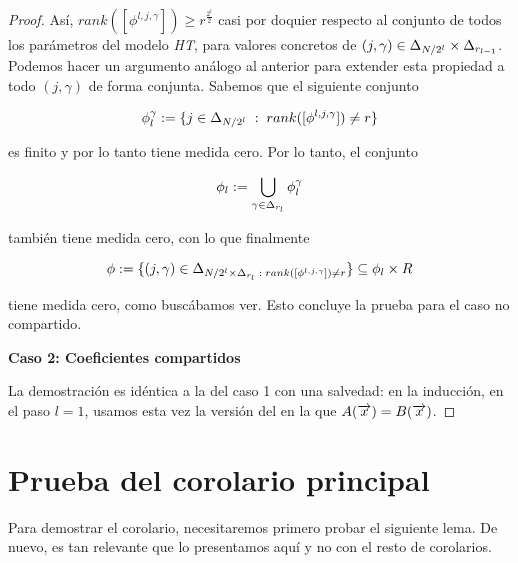 \begin{proof}
    Así, $rank([\phi^{l, j, \gamma}]) \geq r^{\frac{2^l}{2}}$ casi por doquier respecto al conjunto de todos los parámetros del modelo \textit{HT}, para valores concretos de $(j, \gamma) \in \Delta_{N/2^l} \times \Delta_{r_{l-1}}$. Podemos hacer un argumento análogo al anterior para extender esta propiedad a todo $(j, \gamma)$ de forma conjunta. Sabemos que el siguiente conjunto

    \begin{equation}
        \phi_l^{\gamma} := \{ j \in \Delta_{N/2^l} \; : \; rank([\phi^{l, j, \gamma}]) \neq r \}
    \end{equation}

    es finito y por lo tanto tiene medida cero. Por lo tanto, el conjunto

    \begin{equation}
        \phi_l := \bigcup_{ \gamma \in \Delta_{r_l}} \phi_l^{\gamma}
    \end{equation}

    también tiene medida cero, con lo que finalmente

    \begin{equation}
        \phi := \{ (j, \gamma) \in \Delta_{N/2^l \times \Delta_{r_l} \; : \; rank([\phi^{l, j, \gamma}]) \neq r} \} \subseteq \phi_l \times R
    \end{equation}

    tiene medida cero, como buscábamos ver. Esto concluye la prueba para el caso no compartido.

    \textbf{Caso 2: Coeficientes compartidos}

    La demostración es idéntica a la del caso 1 con una salvedad: en la inducción, en el paso $l = 1$, usamos esta vez la versión del  en la que $A(\overrightarrow{x}) = B(\overrightarrow{x})$.
\end{proof}

\section{Prueba del corolario principal}

Para demostrar el corolario, necesitaremos primero probar el siguiente lema. De nuevo, es tan relevante que lo presentamos aquí y no con el resto de corolarios.


